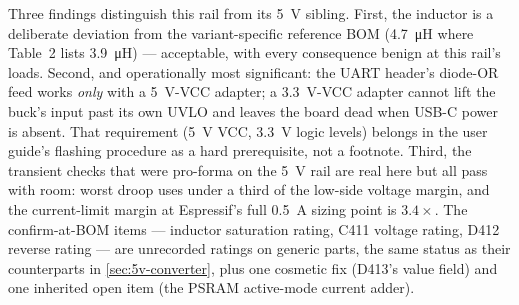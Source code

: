 Three findings distinguish this rail from its 5~V sibling. First, the inductor is a
deliberate deviation from the variant-specific reference BOM (\SI{4.7}{\micro\henry}
where Table~2 lists \SI{3.9}{\micro\henry}) --- acceptable, with every consequence
benign at this rail's loads. Second, and operationally most significant: the UART
header's diode-OR feed works \emph{only} with a \SI{5}{\volt}-VCC adapter; a
\SI{3.3}{\volt}-VCC adapter cannot lift the buck's input past its own UVLO and leaves
the board dead when USB-C power is absent. That requirement (5~V VCC, 3.3~V logic
levels) belongs in the user guide's flashing procedure as a hard prerequisite, not a
footnote. Third, the transient checks that were pro-forma on the 5~V rail are real here
but all pass with room: worst droop uses under a third of the low-side voltage margin,
and the current-limit margin at Espressif's full \SI{0.5}{\ampere} sizing point is
$3.4\times$. The confirm-at-BOM items --- inductor saturation rating, C411 voltage
rating, D412 reverse rating --- are unrecorded ratings on generic parts, the same
status as their counterparts in \cref{sec:5v-converter}, plus one cosmetic fix (D413's
value field) and one inherited open item (the PSRAM active-mode current adder).

